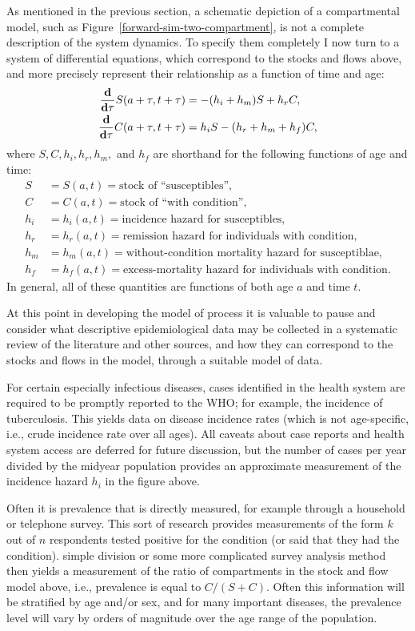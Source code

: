 As mentioned in the previous section, a schematic depiction of a
compartmental model, such as Figure~\ref{forward-sim-two-compartment},
is not a complete description of the system dynamics.  To specify them
completely I now turn to a system of differential equations,
which correspond to the stocks and flows above, and more precisely
represent their relationship as a function of time and age:
\begin{align*}
\frac{\mathbf{d} }{\mathbf{d} \tau} S(a+\tau,t+\tau) &= -(h_i + h_m)S + h_rC,\\
\frac{\mathbf{d}}{\mathbf{d} \tau} C(a+\tau,t+\tau) &= h_iS - (h_r + h_m + h_f)C,\\
\end{align*}
where $S,C,h_i,h_r,h_m,$ and $h_f$ are shorthand for the following functions of age and time:
\begin{align*}
S &= S(a,t) = \text{stock of ``susceptibles''},\\
C &= C(a,t) = \text{stock of ``with condition''},\\[.1in]
h_i &= h_i(a,t) = \text{incidence hazard for susceptibles},\\
h_r &= h_r(a,t) = \text{remission hazard for individuals with condition},\\
h_m &= h_m(a,t) = \text{without-condition mortality hazard for susceptiblae},\\
h_f &= h_f(a,t) = \text{excess-mortality hazard for individuals with
condition}.
\end{align*}
In general, all of these quantities are functions of both age $a$ and
time $t$.

At this point in developing the model of process it is valuable to
pause and consider what descriptive epidemiological data may be
collected in a systematic review of the literature and other sources,
and how they can correspond to the stocks and flows in the model,
through a suitable model of data.

For certain especially infectious diseases, cases identified in the
health system are required to be promptly reported to the WHO; for
example, the incidence of tuberculosis.  This yields data on disease
incidence rates (which is not age-specific, i.e., crude incidence rate
over all ages).  All caveats about case reports and health system
access are deferred for future discussion, but the number of cases per
year divided by the midyear population provides an approximate
measurement of the incidence hazard $h_i$ in the figure above.

Often it is prevalence that is directly measured, for example through
a household or telephone survey.  This sort of research provides
measurements of the form $k$ out of $n$ respondents tested positive
for the condition (or said that they had the condition). simple
division or some more complicated survey analysis method then yields a
measurement of the ratio of compartments in the stock and flow model
above, i.e., prevalence is equal to $C/(S+C)$.  Often this
information will be stratified by age and/or sex, and for many
important diseases, the prevalence level will vary by orders of
magnitude over the age range of the population.


